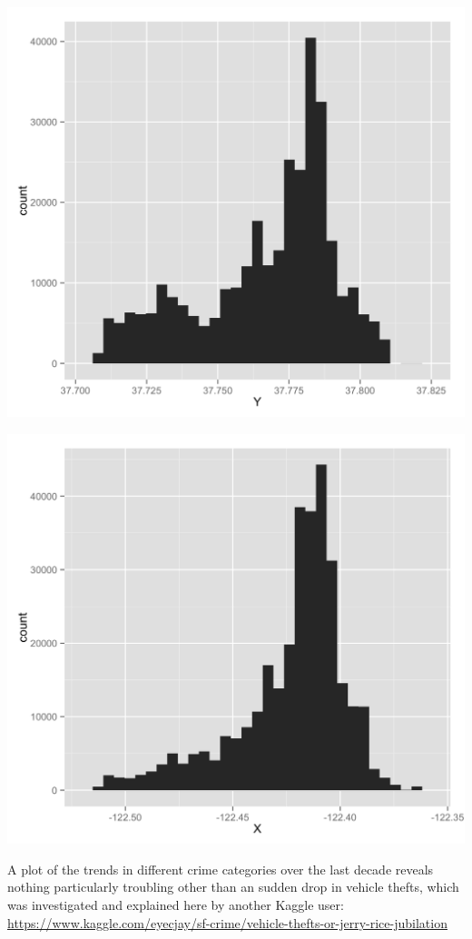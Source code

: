 \documentclass[11pt]{article}
\begin{document}
\begin{center}
\includegraphics{latitude.png}

\includegraphics{longitude.png}

\end{center}

A plot of the trends in different crime categories over the last decade reveals nothing particularly troubling other than an sudden drop in vehicle thefts, which was investigated and explained here by another Kaggle user: \url{https://www.kaggle.com/eyecjay/sf-crime/vehicle-thefts-or-jerry-rice-jubilation}
\end{document}
